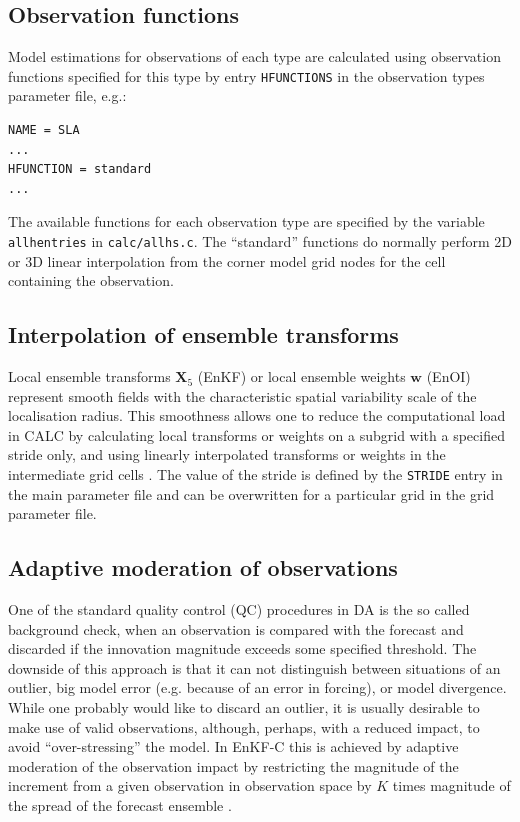 \documentclass[11pt]{report}
\newcommand{\mb} {\mathbf}
\begin{document}
\subsection{Observation functions}
\label{sec:hfunctions}

Model estimations for observations of each type are calculated using observation functions specified for this type by entry \verb|HFUNCTIONS| in the observation types parameter file, e.g.:
\begin{Verbatim}[frame=single,fontsize=\footnotesize]
NAME = SLA
...
HFUNCTION = standard
...
\end{Verbatim}
The available functions for each observation type are specified by the variable \verb|allhentries| in \verb|calc/allhs.c|.
The ``standard'' functions do normally perform 2D or 3D linear interpolation from the corner model grid nodes for the cell containing the observation.

\subsection{Interpolation of ensemble transforms}

Local ensemble transforms $\mb X_5$ (EnKF) or local ensemble weights $\mb w$ (EnOI) represent smooth fields with the characteristic spatial variability scale of the localisation radius.
This smoothness allows one to reduce the computational load in CALC by calculating local transforms or weights on a subgrid with a specified stride only, and using linearly interpolated transforms or weights in the intermediate grid cells \citep{yan09a}.
The value of the stride is defined by the \verb|STRIDE| entry in the main parameter file and can be overwritten for a particular grid in the grid parameter file.

\subsection{Adaptive moderation of observations}

One of the standard quality control (QC) procedures in DA is the so called background check, when an observation is compared with the forecast and discarded if the innovation magnitude exceeds some specified threshold.
The downside of this approach is that it can not distinguish between situations of an outlier, big model error (e.g. because of an error in forcing), or model divergence.
While one probably would like to discard an outlier, it is usually desirable to make use of valid observations, although, perhaps, with a reduced impact, to avoid ``over-stressing'' the model.
In EnKF-C this is achieved by adaptive moderation of the observation impact by restricting the magnitude of the increment from a given observation in observation space by $K$ times magnitude of the spread of the forecast ensemble \citep{sak17a}.
\end{document}
